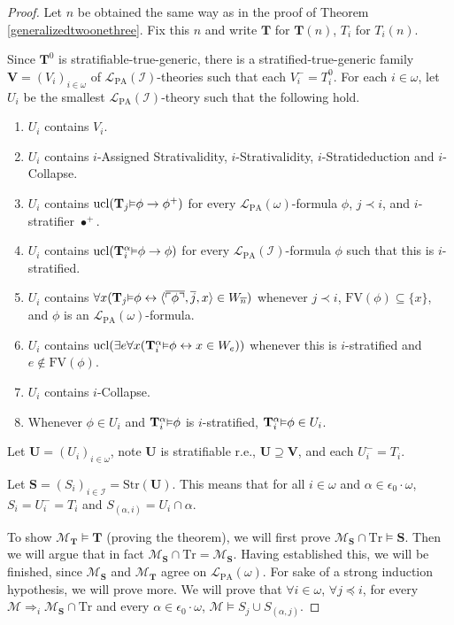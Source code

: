 \documentclass[reqno]{article}
\theoremstyle{definition}
\def\L{\mathscr{L}}
\def\M{\mathscr{M}}
\def\T{\mathbf{T}}
\def\S{\mathbf{S}}
\def\U{\mathbf{U}}
\def\V{\mathbf{V}}
\def\FV{\mathrm{FV}}
\def\LPA{\L_{\mathrm{PA}}}
\def\epom{\epsilon_0\cdot\omega}
\def\indset{\mathcal I}
\def\Tr{\mathrm{Tr}}
\def\ctr{\cap\Tr}
\def\myequiv{\Rightarrow}
\renewcommand{\Pr}[1]{\T_{#1}\mbox{\small${\vDash}$}}
\newcommand{\Prr}[2]{\T^{#1}_{#2}\mbox{\small${\vDash}$}}
\newcommand{\ucl}[1]{\mathrm{ucl}(#1)}
\newcommand{\str}[1]{\mathrm{Str}(#1)} \newcommand{\Str}[1]{\str{#1}}
\begin{document}
\begin{proof}
Let $n$ be obtained the same way as in the proof
of Theorem \ref{generalizedtwoonethree}.
Fix this $n$ and write $\T$ for $\T(n)$, $T_i$ for $T_i(n)$.

Since $\T^0$ is stratifiable-true-generic, there is a stratified-true-generic family $\V=(V_i)_{i\in\omega}$ of $\LPA(\indset)$-theories
such that each $V^-_i=T^0_i$.  For each $i\in\omega$, let $U_i$ be the smallest $\LPA(\indset)$-theory such that the following hold.
\begin{enumerate}
\item $U_i$ contains $V_i$.
\item $U_i$ contains $i$-Assigned Strativalidity, $i$-Strativalidity, $i$-Stratideduction and $i$-Collapse.
\item $U_i$ contains $\ucl{\Pr j\phi\rightarrow\phi^+}$ for every $\LPA(\omega)$-formula $\phi$, $j\prec i$, and $i$-stratifier 
  $\bullet^+$.
\item $U_i$ contains $\ucl{\Prr\alpha i\phi\rightarrow\phi}$ for every $\LPA(\indset)$-formula $\phi$ such that this is $i$-stratified.
\item $U_i$ contains $\forall x(\Pr j\phi\leftrightarrow\langle\overline{\ulcorner\phi\urcorner},\overline j,x\rangle\in
  W_{\overline n})$ whenever $j\prec i$, $\FV(\phi)\subseteq\{x\}$, and $\phi$ is an $\LPA(\omega)$-formula.
\item $U_i$ contains
$\ucl{\exists e\forall x(\Prr\alpha i\phi\leftrightarrow x\in W_e)}$
whenever this is $i$-stratified and $e\not\in\FV(\phi)$.
\item $U_i$ contains $i$-Collapse.
\item Whenever $\phi\in U_i$ and $\Prr\alpha i\phi$ is $i$-stratified, $\Prr\alpha i\phi\in U_i$.
\end{enumerate}
Let $\U=(U_i)_{i\in\omega}$, note $\U$ is stratifiable r.e., $\U\supseteq\V$, and each $U^-_i=T_i$.

Let $\S=(S_i)_{i\in\indset}=\str\U$.  This means that for all $i\in\omega$ and $\alpha\in\epom$,
$S_i=U^-_i=T_i$ and $S_{(\alpha,i)}=U_i\cap\alpha$.

To show $\M_\T\models\T$ (proving the theorem), we will first prove $\M_\S\ctr\models\S$.  Then we will argue that in fact
$\M_\S\ctr=\M_\S$.  Having established this, we will be finished, since $\M_\S$ and $\M_\T$ agree on $\LPA(\omega)$.
For sake of a strong induction hypothesis, we will prove more.
We will prove that $\forall i\in\omega$, $\forall j\preceq i$, for every $\M\myequiv_i\M_\S\ctr$ and every $\alpha\in\epom$,
$\M\models S_j\cup S_{(\alpha,j)}$.


\end{proof}
\end{document}

